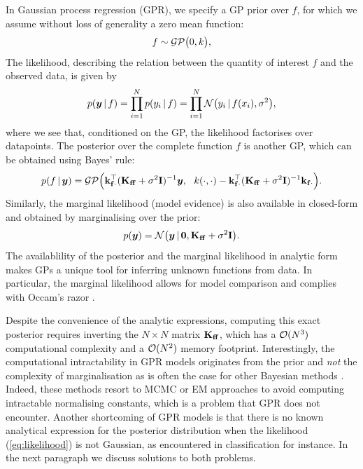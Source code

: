 In Gaussian process regression (GPR), we specify a GP prior over $f$, for which we assume without loss of generality a zero mean function:
\begin{equation}
  f \sim \mathcal{GP}\big(0, k\big),
\end{equation}
The likelihood, describing the relation between the quantity of interest $f$ and the observed data, is given by 
\begin{equation}
  \label{eq:likelihood}
  p(\vy \given f) = \prod_{i=1}^N p(y_i \given f) = \prod_{i=1}^N \NormDist{y_i \given f(x_i), \sigma^2},
\end{equation}
where we see that, conditioned on the GP, the likelihood factorises over datapoints. The posterior over the complete function $f$ is another GP, which can be obtained using Bayes' rule:
\begin{equation}
  \label{eq:f-given-y}
  p(f \,|\, \bm{y}) 
      = \mathcal{GP}\Big(\mathbf{k}_{\mathbf{f} \cdot}^\top (\mathbf{{K}}_{\mathbf{f} \mathbf{f}} + \sigma^2 \mathbf{{I}})^{-1} \bm{y},\ \ k(\cdot, \cdot) -  \mathbf{k}_{\mathbf{f} \cdot}^\top (\mathbf{{K}}_{\mathbf{f} \mathbf{f}} + \sigma^2 \mathbf{{I}})^{-1} \mathbf{k}_{\mathbf{f} \cdot}\Big).
\end{equation}
Similarly, the marginal likelihood (model evidence) is also available in closed-form and obtained by marginalising over the prior:
\begin{equation}
  \label{eq:log-marginal-likelihood}
  p(\vy) = \NormDist{\vy \given \vzero, \Kff + \sigma^2 \Eye}.
\end{equation}
The availablility of the posterior and the marginal likelihood in analytic form makes GPs a unique tool for inferring unknown functions from data. In particular, the marginal likelihood allows for model comparison and complies with Occam's razor \citep[Chapter 28]{mackay2003information}.

Despite the convenience of the analytic expressions, computing this exact posterior requires inverting the $N \times N$ matrix $\Kff$, which has a $\mathcal{O}(N^3)$ computational complexity and a $\mathcal{O}(N^2)$ memory footprint. Interestingly, the computational intractability in GPR models originates from the prior and \emph{not} the complexity of marginalisation as is often the case for other Bayesian methods \citep[e.g.,][]{blei2003latent}. Indeed, these methods resort to MCMC or EM approaches to avoid computing intractable normalising constants, which is a problem that GPR does not encounter.  Another shortcoming of GPR models is that there is no known analytical expression for the posterior distribution when the likelihood (\cref{eq:likelihood}) is not Gaussian, as encountered in classification for instance. In the next paragraph we discuss solutions to both problems.

